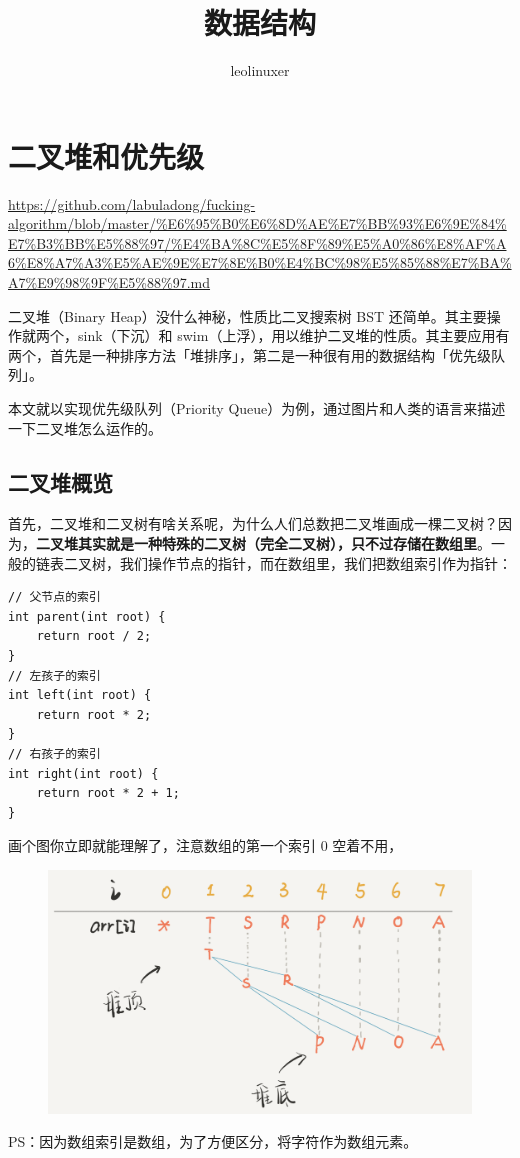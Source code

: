 \documentclass[12pt]{article}
\title{数据结构}
\author{leolinuxer}
\begin{document}
\maketitle
\tableofcontents

\section{二叉堆和优先级}
\url{https://github.com/labuladong/fucking-algorithm/blob/master/%E6%95%B0%E6%8D%AE%E7%BB%93%E6%9E%84%E7%B3%BB%E5%88%97/%E4%BA%8C%E5%8F%89%E5%A0%86%E8%AF%A6%E8%A7%A3%E5%AE%9E%E7%8E%B0%E4%BC%98%E5%85%88%E7%BA%A7%E9%98%9F%E5%88%97.md}

二叉堆（Binary Heap）没什么神秘，性质比二叉搜索树 BST 还简单。其主要操作就两个，sink（下沉）和 swim（上浮），用以维护二叉堆的性质。其主要应用有两个，首先是一种排序方法「堆排序」，第二是一种很有用的数据结构「优先级队列」。

本文就以实现优先级队列（Priority Queue）为例，通过图片和人类的语言来描述一下二叉堆怎么运作的。

\subsection{二叉堆概览}
首先，二叉堆和二叉树有啥关系呢，为什么人们总数把二叉堆画成一棵二叉树？因为，\textbf{二叉堆其实就是一种特殊的二叉树（完全二叉树），只不过存储在数组里}。一般的链表二叉树，我们操作节点的指针，而在数组里，我们把数组索引作为指针：
\begin{lstlisting}
// 父节点的索引
int parent(int root) {
    return root / 2;
}
// 左孩子的索引
int left(int root) {
    return root * 2;
}
// 右孩子的索引
int right(int root) {
    return root * 2 + 1;
}
\end{lstlisting}

画个图你立即就能理解了，注意数组的第一个索引 0 空着不用，
\begin{figure}[H]
    \centering
    \includegraphics[width=.6\textwidth]{fig/Binary_Heap_1.png}
\end{figure}
PS：因为数组索引是数组，为了方便区分，将字符作为数组元素。
\end{document}
